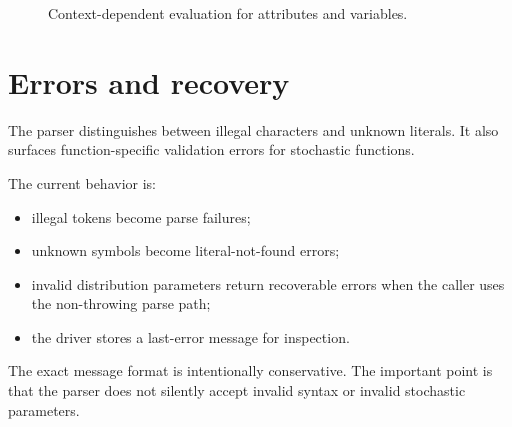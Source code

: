 \begin{figure}[htbp]
\centering
\caption{Context-dependent evaluation for attributes and variables.}
\label{fig:expression-context-model}
\end{figure}

\section{Errors and recovery}
\label{sec:expression-reference-errors}

The parser distinguishes between illegal characters and unknown literals. It
also surfaces function-specific validation errors for stochastic functions.

The current behavior is:
\begin{itemize}
\item illegal tokens become parse failures;
\item unknown symbols become literal-not-found errors;
\item invalid distribution parameters return recoverable errors when the
      caller uses the non-throwing parse path;
\item the driver stores a last-error message for inspection.
\end{itemize}

The exact message format is intentionally conservative. The important point is
that the parser does not silently accept invalid syntax or invalid stochastic
parameters.

